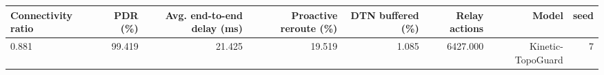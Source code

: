\begin{tabular}{lrrrrrrr}
\toprule
Connectivity ratio & PDR (\%) & Avg. end-to-end delay (ms) & Proactive reroute (\%) & DTN buffered (\%) & Relay actions & Model & seed \\
\midrule
0.881 & 99.419 & 21.425 & 19.519 & 1.085 & 6427.000 & Kinetic-TopoGuard & 7 \\
\bottomrule
\end{tabular}